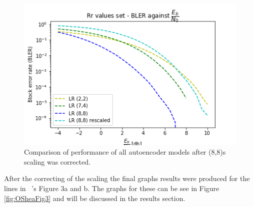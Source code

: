 \documentclass[12pt,onecolumn,letterpaper]{article}
\newcommand\genfigsize{0.5}
\begin{document}
\begin{figure}[t]
   \centering
   \includegraphics[width=\genfigsize\linewidth]{figures/autoencoders_recorrected_88_scaling.png}
   \caption{Comparison of performance of all autoencoder models after (8,8)s scaling was corrected.}
   \label{fig:Autoencoders88ScalingCorrected}
\end{figure}

After the correcting of the scaling the final graphs results were produced for the lines in ~\cite{oShea}'s Figure 3a and b. The graphs for these can be see in Figure \ref{fig:OSheaFig3} and will be discussed in the results section. 
\end{document}
